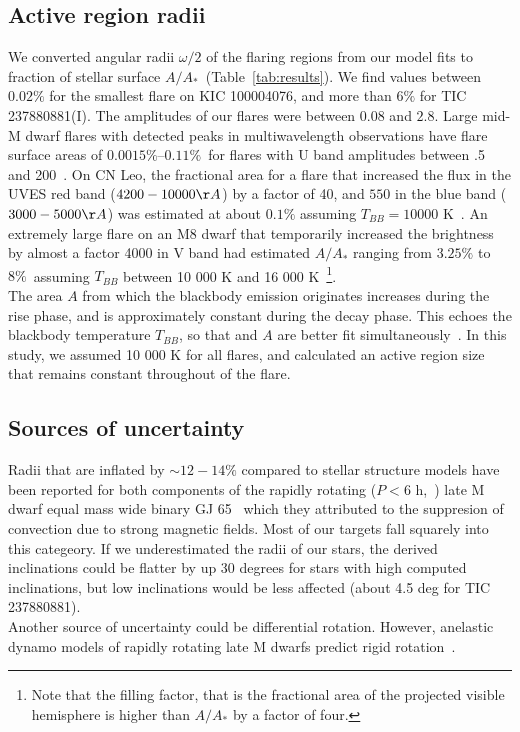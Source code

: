 \documentclass[fleqn,usenatbib,letters]{mnras}%
\newcommand{\FC}{TIC 237880881} %
\newcommand{\FE}{KIC 100004076} %
\begin{document}
\subsection{Active region radii}
We converted angular radii $\omega/2$ of the flaring regions from our model fits to fraction of stellar surface $A/A_*$~(Table~\ref{tab:results}). We find values between $0.02\%$ for the smallest flare on \FE, and more than $6\%$ for \FC (I). The amplitudes of our flares were between $0.08$ and $2.8$. Large mid-M dwarf flares with detected peaks in multiwavelength observations have flare surface areas of $0.0015\%–0.11\%$~for flares with U band amplitudes between .5 and 200~\citep{kowalski2013}. On CN Leo, the fractional area for a flare that increased the flux in the UVES red band ($4200-10000\AA$) by a factor of 40, and $550$ in the blue band ($3000-5000\AA$) was estimated at about $0.1\%$ assuming $T_{BB}=10 000$ K~\citep{fuhrmeister2008}. An extremely large flare on an M8 dwarf that temporarily increased the brightness by almost a factor 4000 in V band had estimated $A/A_*$ ranging from $3.25\%$ to $8\%$~assuming $T_{BB}$ between 10 000 K and 16 000 K~\citep{schmidt2014}\footnote{Note that the filling factor, that is the fractional area of the projected visible hemisphere is higher than $A/A_*$ by a factor of four.}.
\\
The area $A$ from which the blackbody emission originates increases during the rise phase, and is approximately constant during the decay phase. This echoes the blackbody temperature $T_{BB}$, so that and $A$ are better fit simultaneously~\citep{kowalski2013}. In this study, we assumed 10 000 K for all flares, and calculated an active region size that remains constant throughout of the flare.
\subsection{Sources of uncertainty}

Radii that are inflated by $\sim 12-14\%$ compared to stellar structure models have been reported for both components of the rapidly rotating ($P<6$ h,~\citealt{barnes2017}) late M dwarf equal mass wide binary GJ 65~\citep{kervella2016} which they attributed to the suppresion of convection due to strong magnetic fields. Most of our targets fall squarely into this categeory.
If we underestimated the radii of our stars, the derived inclinations could be flatter by up 30 degrees for stars with high computed inclinations, but low inclinations would be less affected (about 4.5 deg for \FC).
\\
Another source of uncertainty could be differential rotation. However, anelastic dynamo models of rapidly rotating late M dwarfs predict rigid rotation~\citep{gastine2012, gastine2013}.
\end{document}
